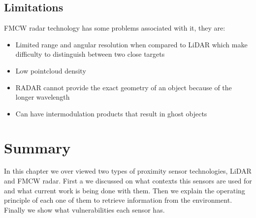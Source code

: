  
\subsection{Limitations}
\ac{FMCW} {radar} technology has some problems associated with it, they are:
\begin{itemize}
\item{Limited range and angular resolution when compared to \ac{LiDAR} which make difficulty to distinguish between two close targets}  
\item{Low pointcloud density}  
\item{RADAR cannot provide the exact geometry of an object because of the longer wavelength}  
\item{Can have intermodulation products that result in ghost objects} 
\end{itemize}
\section{Summary}
In this chapter we over viewed two types of proximity sensor technologies, \ac{LiDAR} and \ac{FMCW} radar. First a we discussed on what contexts this sensors are used for and what current work is being done with them. Then we explain the operating principle of each one of them to retrieve information from the environment.  Finally we show what vulnerabilities each sensor has.





